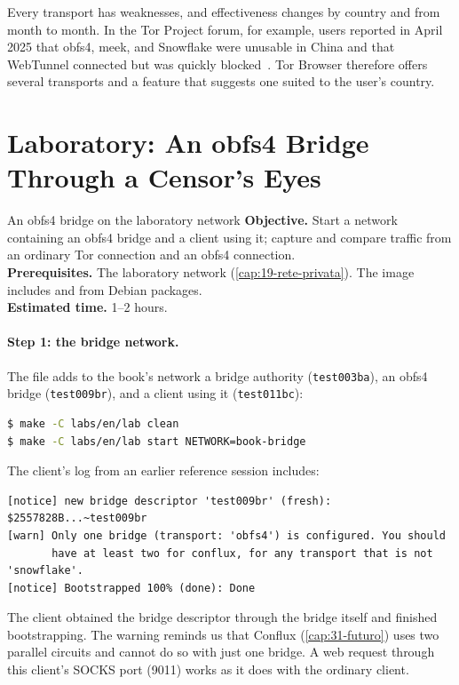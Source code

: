 \begin{attenzione}
Every transport has weaknesses, and effectiveness changes by country and from month to month. In the Tor Project forum, for example, users reported in April 2025 that obfs4, meek, and Snowflake were unusable in China and that WebTunnel connected but was quickly blocked~\cite{forumcina2025}. Tor Browser therefore offers several transports and a feature that suggests one suited to the user's country.
\end{attenzione}

\section{Laboratory: An obfs4 Bridge Through a Censor's Eyes}\label{sec:lab-censura}

\begin{laboratorio}[10]{An obfs4 bridge on the laboratory network}
\textbf{Objective.} Start a network containing an obfs4 bridge and a client using it; capture and compare traffic from an ordinary Tor connection and an obfs4 connection.\\
\textbf{Prerequisites.} The laboratory network (\cref{cap:19-rete-privata}). The image includes  and  from Debian packages.\\
\textbf{Estimated time.} 1--2 hours.
\end{laboratorio}

\paragraph{Step 1: the bridge network.} The  file adds to the book's network a bridge authority (\texttt{test003ba}), an obfs4 bridge (\texttt{test009br}), and a client using it (\texttt{test011bc}):
\begin{lstlisting}[language=bash,numbers=none]
$ make -C labs/en/lab clean
$ make -C labs/en/lab start NETWORK=book-bridge
\end{lstlisting}
The client's log from an earlier reference session includes:
\begin{lstlisting}[numbers=none]
[notice] new bridge descriptor 'test009br' (fresh): $2557828B...~test009br
[warn] Only one bridge (transport: 'obfs4') is configured. You should
       have at least two for conflux, for any transport that is not 'snowflake'.
[notice] Bootstrapped 100% (done): Done
\end{lstlisting}
The client obtained the bridge descriptor through the bridge itself and finished bootstrapping. The warning reminds us that Conflux (\cref{cap:31-futuro}) uses two parallel circuits and cannot do so with just one bridge. A web request through this client's SOCKS port (9011) works as it does with the ordinary client.

